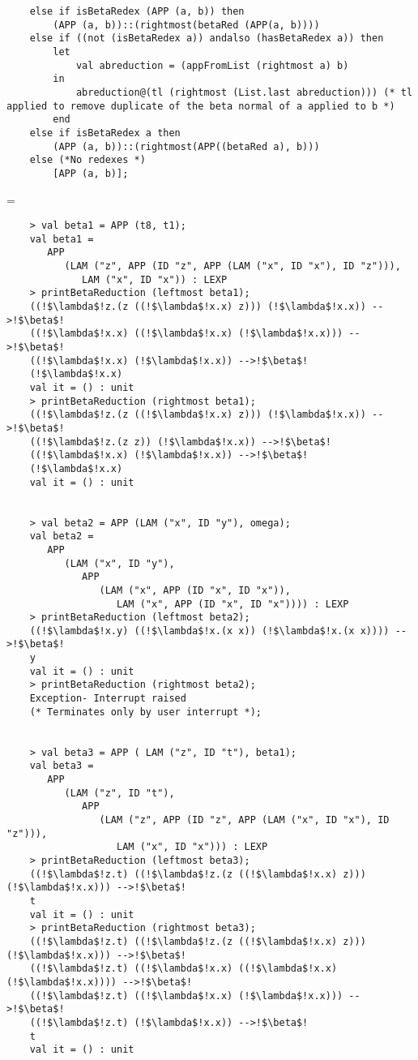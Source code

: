 \documentclass[11pt]{article}
\newenvironment{neverbreak} %
{\par\nobreak\vfil\penalty0\vfilneg
	\vtop\bgroup}
{\par\xdef\tpd{\the\prevdepth}\egroup
	\prevdepth=\tpd}
\begin{document}
\begin{enumerate}
\begin{neverbreak}
\begin{verbatim}
	else if isBetaRedex (APP (a, b)) then
		(APP (a, b))::(rightmost(betaRed (APP(a, b))))
	else if ((not (isBetaRedex a)) andalso (hasBetaRedex a)) then
		let
			val abreduction = (appFromList (rightmost a) b)
		in
			abreduction@(tl (rightmost (List.last abreduction))) (* tl applied to remove duplicate of the beta normal of a applied to b *)
		end
	else if isBetaRedex a then
		(APP (a, b))::(rightmost(APP((betaRed a), b)))
	else (*No redexes *)
		[APP (a, b)];
\end{verbatim}
\end{neverbreak}
\vspace{1cm}
\begin{verbatim}
	> val beta1 = APP (t8, t1);
	val beta1 =
	   APP
	      (LAM ("z", APP (ID "z", APP (LAM ("x", ID "x"), ID "z"))),
	         LAM ("x", ID "x")) : LEXP 
	> printBetaReduction (leftmost beta1);
	((!$\lambda$!z.(z ((!$\lambda$!x.x) z))) (!$\lambda$!x.x)) -->!$\beta$!
	((!$\lambda$!x.x) ((!$\lambda$!x.x) (!$\lambda$!x.x))) -->!$\beta$!
	((!$\lambda$!x.x) (!$\lambda$!x.x)) -->!$\beta$!
	(!$\lambda$!x.x)
	val it = () : unit
	> printBetaReduction (rightmost beta1);
	((!$\lambda$!z.(z ((!$\lambda$!x.x) z))) (!$\lambda$!x.x)) -->!$\beta$!
	((!$\lambda$!z.(z z)) (!$\lambda$!x.x)) -->!$\beta$!
	((!$\lambda$!x.x) (!$\lambda$!x.x)) -->!$\beta$!
	(!$\lambda$!x.x)
	val it = () : unit
	
	
	> val beta2 = APP (LAM ("x", ID "y"), omega);
	val beta2 =
	   APP
	      (LAM ("x", ID "y"),
	         APP
	            (LAM ("x", APP (ID "x", ID "x")),
	               LAM ("x", APP (ID "x", ID "x")))) : LEXP
	> printBetaReduction (leftmost beta2);
	((!$\lambda$!x.y) ((!$\lambda$!x.(x x)) (!$\lambda$!x.(x x)))) -->!$\beta$!
	y
	val it = () : unit
	> printBetaReduction (rightmost beta2);
	Exception- Interrupt raised 
	(* Terminates only by user interrupt *);
	
	
	> val beta3 = APP ( LAM ("z", ID "t"), beta1);
	val beta3 =
	   APP
	      (LAM ("z", ID "t"),
	         APP
	            (LAM ("z", APP (ID "z", APP (LAM ("x", ID "x"), ID "z"))),
	               LAM ("x", ID "x"))) : LEXP
	> printBetaReduction (leftmost beta3);
	((!$\lambda$!z.t) ((!$\lambda$!z.(z ((!$\lambda$!x.x) z))) (!$\lambda$!x.x))) -->!$\beta$!
	t
	val it = () : unit
	> printBetaReduction (rightmost beta3);
	((!$\lambda$!z.t) ((!$\lambda$!z.(z ((!$\lambda$!x.x) z))) (!$\lambda$!x.x))) -->!$\beta$!
	((!$\lambda$!z.t) ((!$\lambda$!x.x) ((!$\lambda$!x.x) (!$\lambda$!x.x)))) -->!$\beta$!
	((!$\lambda$!z.t) ((!$\lambda$!x.x) (!$\lambda$!x.x))) -->!$\beta$!
	((!$\lambda$!z.t) (!$\lambda$!x.x)) -->!$\beta$!
	t
	val it = () : unit
\end{verbatim}

\end{enumerate}
\newpage
\end{document}

